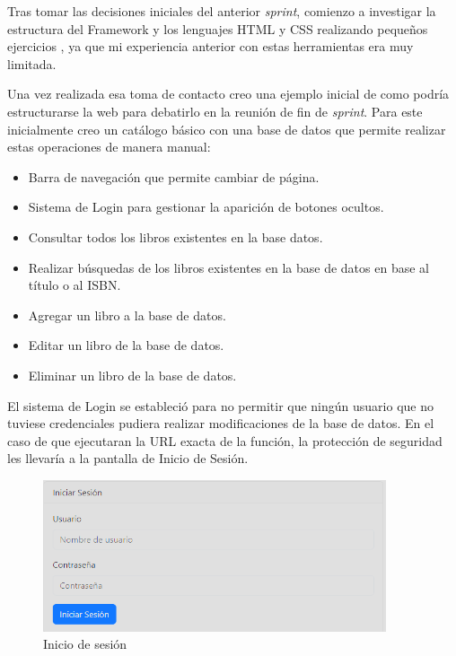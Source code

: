 Tras tomar las decisiones iniciales del anterior \textit{sprint}, comienzo a investigar la estructura del Framework y los lenguajes HTML y CSS realizando pequeños ejercicios , ya que mi experiencia anterior con estas herramientas era muy limitada.

Una vez realizada esa toma de contacto  creo una ejemplo inicial de como podría estructurarse la web para debatirlo en la reunión de fin de \textit{sprint}.
Para este inicialmente creo un catálogo básico  con una base de datos que permite realizar estas operaciones de manera manual:

\begin{itemize}
    \item Barra de navegación que permite cambiar de página.
    \item Sistema de Login para gestionar la aparición de botones ocultos.
    \item Consultar todos los libros existentes en la base datos.
    \item Realizar búsquedas de los libros existentes en la base de datos en base al título o al ISBN.
    \item Agregar un libro a la base de datos.
    \item Editar un libro de la base de datos.
    \item Eliminar un libro de la base de datos.

\end{itemize}

El sistema de Login se estableció para no permitir que ningún usuario que no tuviese credenciales pudiera realizar modificaciones de la base de datos. En el caso de que ejecutaran la URL exacta de la función, la protección de seguridad les llevaría a la pantalla de Inicio de Sesión.

\begin{figure}[h]
    \centering
    \includegraphics[width=0.9\textwidth]{Imagenes/Inicio_Sesion.png}
    \caption{Inicio de sesión}
    \label{Inicio de sesión}
\end{figure}

